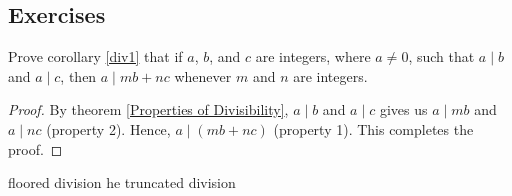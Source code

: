     \subsection{Exercises}
    \begin{exercise}
        Prove corollary \ref{div1} that if $a$, $b$, and $c$ are integers, where $a\neq 0$, such that $a\mid b$ and $a\mid c$, then $a\mid mb + nc$ whenever $m$ and $n$ are integers.
    \end{exercise}
    \begin{proof}
        By theorem \ref{Properties of Divisibility}, $a\mid b$ and $a\mid c$ gives us $a\mid mb$
        and $a\mid nc$ (property 2). Hence, $a\mid (mb+nc)$ (property 1). This completes the proof.
    \end{proof}
    
    \begin{exercise}
        floored division he truncated division
    \end{exercise}

